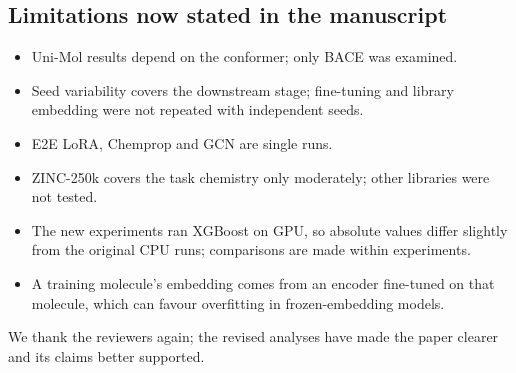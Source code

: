 \documentclass[
  10pt,
]{article}
\providecommand{\tightlist}{%
  \setlength{\itemsep}{0pt}\setlength{\parskip}{0pt}}
\begin{document}
\hypertarget{limitations-now-stated-in-the-manuscript}{%
\subsection{Limitations now stated in the
manuscript}\label{limitations-now-stated-in-the-manuscript}}

\begin{itemize}
\tightlist
\item
  Uni-Mol results depend on the conformer; only BACE was examined.
\item
  Seed variability covers the downstream stage; fine-tuning and library
  embedding were not repeated with independent seeds.
\item
  E2E LoRA, Chemprop and GCN are single runs.
\item
  ZINC-250k covers the task chemistry only moderately; other libraries
  were not tested.
\item
  The new experiments ran XGBoost on GPU, so absolute values differ
  slightly from the original CPU runs; comparisons are made within
  experiments.
\item
  A training molecule's embedding comes from an encoder fine-tuned on
  that molecule, which can favour overfitting in frozen-embedding
  models.
\end{itemize}

We thank the reviewers again; the revised analyses have made the paper
clearer and its claims better supported.
\end{document}
